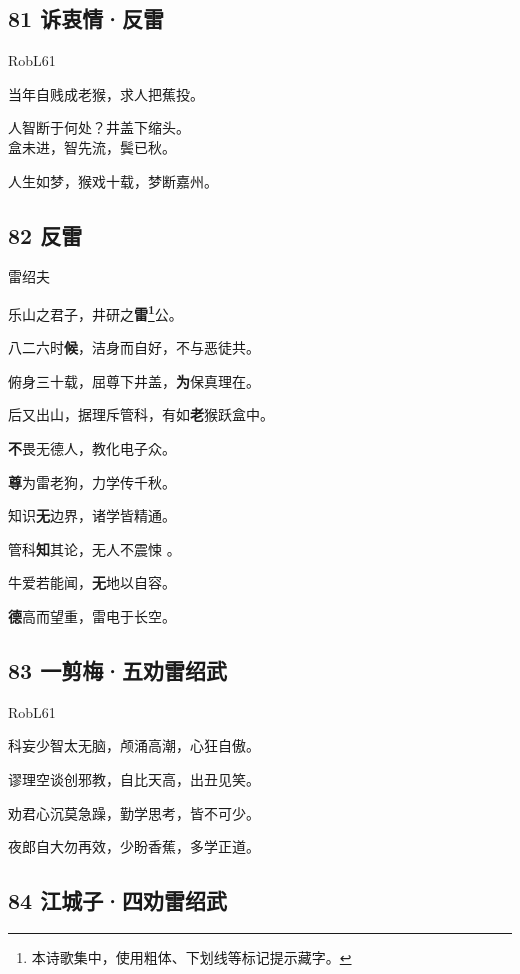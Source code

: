 \hypertarget{ux8bc9ux8877ux60c5ux53cdux96f7}{%
\subsection{81 诉衷情·反雷}\label{ux8bc9ux8877ux60c5ux53cdux96f7}}

{RobL61}

当年自贱成老猴，求人把蕉投。

人智断于何处？井盖下缩头。 ~\\
盒未进，智先流，鬓已秋。

人生如梦，猴戏十载，梦断嘉州。

\hypertarget{ux53cdux96f7-1}{%
\subsection{82 反雷}\label{ux53cdux96f7-1}}

{雷绍夫}

乐山之君子，井研之\textbf{雷\footnote{本诗歌集中，使用粗体、下划线等标记提示藏字。}}公。

八二六时\textbf{候}，洁身而自好，不与恶徒共。

俯身三十载，屈尊下井盖，\textbf{为}保真理在。

后又出山，据理斥管科，有如\textbf{老}猴跃盒中。

\textbf{不}畏无德人，教化电子众。

\textbf{尊}为雷老狗，力学传千秋。

知识\textbf{无}边界，诸学皆精通。

管科\textbf{知}其论，无人不震悚 。

牛爱若能闻，\textbf{无}地以自容。

\textbf{德}高而望重，雷电于长空。

\hypertarget{ux4e00ux526aux6885ux4e94ux529dux96f7ux7ecdux6b66}{%
\subsection{83
一剪梅·五劝雷绍武}\label{ux4e00ux526aux6885ux4e94ux529dux96f7ux7ecdux6b66}}

{RobL61}

科妄少智太无脑，颅涌高潮，心狂自傲。

谬理空谈创邪教，自比天高，出丑见笑。

劝君心沉莫急躁，勤学思考，皆不可少。

夜郎自大勿再效，少盼香蕉，多学正道。

\hypertarget{ux6c5fux57ceux5b50ux56dbux529dux96f7ux7ecdux6b66}{%
\subsection{84
江城子·四劝雷绍武}\label{ux6c5fux57ceux5b50ux56dbux529dux96f7ux7ecdux6b66}}

